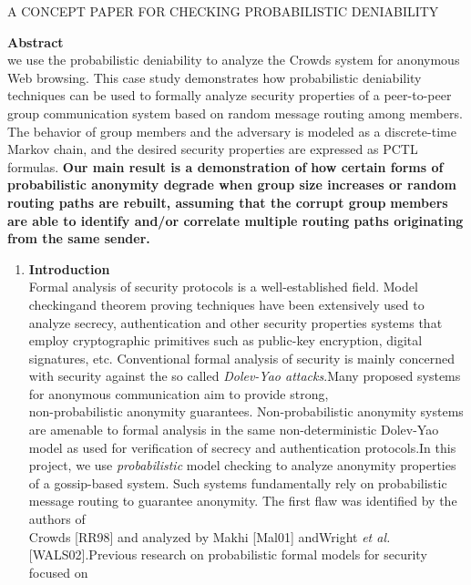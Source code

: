 \documentclass[10pt]{article}
\author{Admin}
\title{}
\begin{document}
\begin{center}
{\large A CONCEPT PAPER FOR CHECKING PROBABILISTIC DENIABILITY}
\end{center}

{\raggedright
\textbf{Abstract}
\\
we use the probabilistic deniability to analyze the Crowds system for anonymous
Web browsing. This case study demonstrates how probabilistic deniability
techniques can be used to formally analyze security properties of a peer-to-peer
group communication system based on random message routing among members. The
behavior of group members and the adversary is modeled as a discrete-time Markov
chain, and the desired security properties are expressed as PCTL formulas.{\large
 } \textbf{Our main result is a demonstration of}\textbf{ }\textbf{how certain
forms of probabilistic anonymity degrade when group size increases or random
routing paths are rebuilt, assuming that the corrupt group}\textbf{
}\textbf{members are able to identify and/or correlate multiple routing paths
originating from the same sender.}
}

\begin{enumerate}
	\item \textbf{Introduction}
\\
Formal analysis of security protocols is a well-established field. Model
checking{\large  }and theorem proving techniques have been extensively used to
analyze secrecy, authentication and other security properties systems that employ
cryptographic primitives such as public-key encryption, digital signatures, etc.
Conventional formal analysis of security is mainly concerned with security{\large
 }against the so called \textit{Dolev-Yao attacks}.{\large  }Many proposed
systems for anonymous communication aim to provide strong,
\\
non-probabilistic anonymity guarantees. Non-probabilistic anonymity systems are
amenable to formal analysis in the same non-deterministic Dolev-Yao model as used
for verification of secrecy and authentication protocols.{\large  }In this
project, we use \textit{probabilistic }model checking to analyze anonymity
properties of a gossip-based system. Such systems fundamentally rely on
probabilistic
\\
message routing to guarantee anonymity. The first flaw was identified by the
authors of
\\
Crowds [RR98] and analyzed by Makhi [Mal01] and{\large  }Wright \textit{et al.
}[WALS02].{\large  }Previous research on probabilistic formal models for security
focused on
\end{enumerate}
\end{document}
